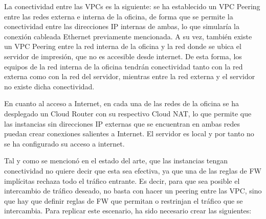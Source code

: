   La conectividad entre las VPCs es la siguiente: se ha establecido un VPC Peering entre las redes externa e interna de la oficina, de forma que se permite la conectividad entre las direcciones IP internas de ambas, lo que simularía la conexión cableada Ethernet previamente mencionada. A su vez, también existe un VPC Peering entre la red interna de la oficina y la red donde se ubica el servidor de impresión, que no es accesible desde internet. De esta forma, los equipos de la red interna de la oficina tendrán conectividad tanto con la red externa como con la red del servidor, mientras entre la red externa y el servidor no existe dicha conectividad.

  En cuanto al acceso a Internet, en cada una de las redes de la oficina se ha desplegado un Cloud Router con su respectivo Cloud NAT, lo que permite que las instancias sin direcciones IP externas que se encuentran en ambas redes puedan crear conexiones salientes a Internet. El servidor es local y por tanto no se ha configurado su acceso a internet. 

  Tal y como se mencionó en el estado del arte, que las instancias tengan conectividad no quiere decir que esta sea efectiva, ya que una de las reglas de FW implícitas rechaza todo el tráfico entrante. Es decir, para que sea posible el intercambio de tráfico deseado, no basta con hacer un peering entre las VPC, sino que hay que definir reglas de FW que permitan o restrinjan el tráfico que se intercambia. Para replicar este escenario, ha sido necesario crear las siguientes:

